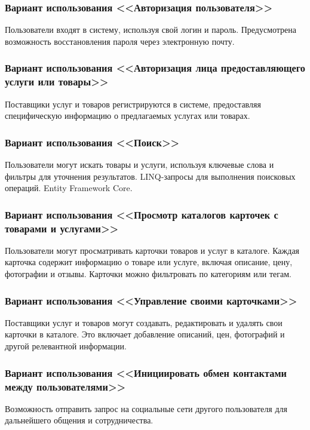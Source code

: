 \subsubsection{Вариант использования <<Авторизация пользователя>>} 
Пользователи входят в систему, используя свой логин и пароль. Предусмотрена возможность восстановления пароля через электронную почту.

\subsubsection{Вариант использования <<Авторизация лица предоставляющего услуги или товары>>} 
Поставщики услуг и товаров регистрируются в системе, предоставляя специфическую информацию о предлагаемых услугах или товарах.

\subsubsection{Вариант использования <<Поиск>>} 
Пользователи могут искать товары и услуги, используя ключевые слова и фильтры для уточнения результатов. LINQ-запросы для выполнения поисковых операций. Entity Framework Core.

\subsubsection{Вариант использования <<Просмотр каталогов карточек с товарами и услугами>>}
Пользователи могут просматривать карточки товаров и услуг в каталоге. Каждая карточка содержит информацию о товаре или услуге, включая описание, цену, фотографии и отзывы. Карточки можно фильтровать по категориям или тегам.

\subsubsection{Вариант использования <<Управление своими карточками>>}
Поставщики услуг и товаров могут создавать, редактировать и удалять свои карточки в каталоге. Это включает добавление описаний, цен, фотографий и другой релевантной информации.

\subsubsection{Вариант использования <<Инициировать обмен контактами между пользователями>>} 
Возможность отправить запрос на социальные сети другого пользователя для дальнейшего общения и сотрудничества.

